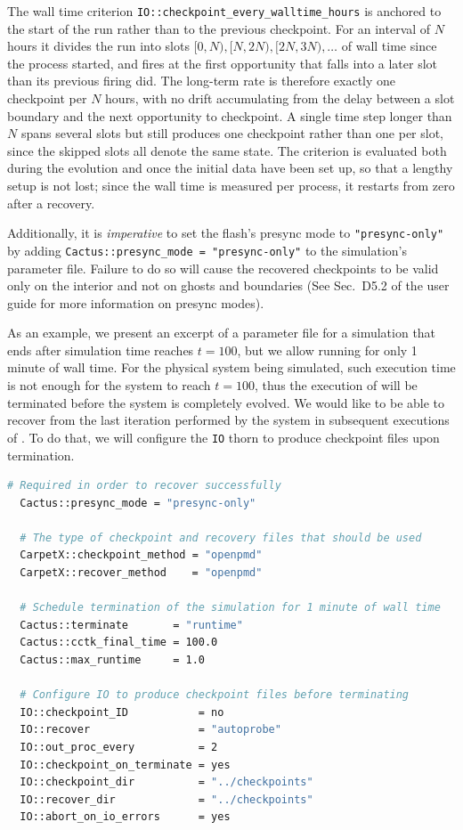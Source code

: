 The wall time criterion \texttt{IO::checkpoint\_every\_walltime\_hours} is anchored to the start of the run rather than to the previous checkpoint. For an interval of $N$ hours it divides the run into slots $[0,N), [N,2N), [2N,3N), \ldots$ of wall time since the process started, and fires at the first opportunity that falls into a later slot than its previous firing did. The long-term rate is therefore exactly one checkpoint per $N$ hours, with no drift accumulating from the delay between a slot boundary and the next opportunity to checkpoint. A single time step longer than $N$ spans several slots but still produces one checkpoint rather than one per slot, since the skipped slots all denote the same state. The criterion is evaluated both during the evolution and once the initial data have been set up, so that a lengthy setup is not lost; since the wall time is measured per process, it restarts from zero after a recovery.

Additionally, it is \textit{imperative} to set the flash's presync mode to \texttt{"presync-only"} by adding \texttt{Cactus::presync\_mode = "presync-only"} to the simulation's parameter file. Failure to do so will cause the recovered checkpoints to be valid only on the interior and not on ghosts and boundaries (See Sec.~D5.2 of the \Cactus\space user guide for more information on presync modes).

As an example, we present an excerpt of a parameter file for a simulation that ends after simulation time reaches $t=100$, but we allow \Cactus\space running for only 1 minute of wall time. For the physical system being simulated, such execution time is not enough for the system to reach $t=100$, thus the execution of \Cactus\space will be terminated before the system is completely evolved. We would like to be able to recover from the last iteration performed by the system in subsequent executions of \Cactus. To do that, we will configure the \texttt{IO} thorn to produce checkpoint files upon \Cactus\space termination.

\begin{lstlisting}[language=bash]
  # Required in order to recover successfully
  Cactus::presync_mode = "presync-only"

  # The type of checkpoint and recovery files that should be used
  CarpetX::checkpoint_method = "openpmd"
  CarpetX::recover_method    = "openpmd"

  # Schedule termination of the simulation for 1 minute of wall time
  Cactus::terminate       = "runtime"
  Cactus::cctk_final_time = 100.0
  Cactus::max_runtime     = 1.0

  # Configure IO to produce checkpoint files before terminating
  IO::checkpoint_ID           = no
  IO::recover                 = "autoprobe"
  IO::out_proc_every          = 2
  IO::checkpoint_on_terminate = yes
  IO::checkpoint_dir          = "../checkpoints"
  IO::recover_dir             = "../checkpoints"
  IO::abort_on_io_errors      = yes
\end{lstlisting}


